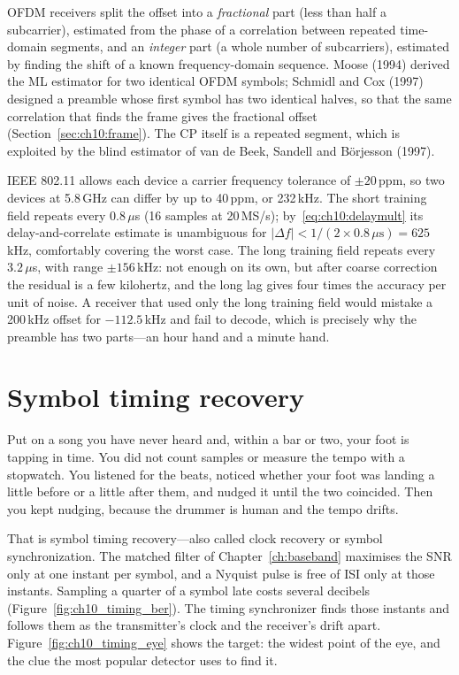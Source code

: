OFDM receivers split the offset into a \emph{fractional} part (less than half a subcarrier),
estimated from the phase of a correlation between repeated time-domain segments, and an
\emph{integer} part (a whole number of subcarriers), estimated by finding the shift of a known
frequency-domain sequence. Moose (1994) derived the ML estimator for two identical OFDM symbols;
Schmidl and Cox (1997) designed a preamble whose first symbol has two identical halves, so that the
same correlation that finds the frame gives the fractional offset (Section~\ref{sec:ch10:frame}). The
CP itself is a repeated segment, which is exploited by the blind estimator of van de Beek, Sandell
and B\"orjesson (1997).

\begin{worked}
IEEE 802.11 allows each device a carrier frequency tolerance of $\pm20$\,ppm, so two devices at
5.8\,GHz can differ by up to 40\,ppm, or 232\,kHz. The short training field repeats every
$0.8\,\mu$s (16 samples at 20\,MS/s); by~\eqref{eq:ch10:delaymult} its delay-and-correlate estimate is
unambiguous for $|\Delta f|<1/(2\times0.8\,\mu\text{s})=625$\,kHz, comfortably covering the worst case. The
long training field repeats every $3.2\,\mu$s, with range $\pm156$\,kHz: not enough on its own, but
after coarse correction the residual is a few kilohertz, and the long lag gives four times the
accuracy per unit of noise. A receiver that used only the long training field would mistake a
200\,kHz offset for $-112.5$\,kHz and fail to decode, which is precisely why the preamble has two
parts---an hour hand and a minute hand.
\end{worked}

\section{Symbol timing recovery}
\label{sec:ch10:timing}

Put on a song you have never heard and, within a bar or two, your foot is tapping in time. You
did not count samples or measure the tempo with a stopwatch. You listened for the beats, noticed
whether your foot was landing a little before or a little after them, and nudged it until the
two coincided. Then you kept nudging, because the drummer is human and the tempo drifts.

That is symbol timing recovery---also called clock recovery or symbol synchronization. The matched
filter of Chapter~\ref{ch:baseband} maximises the SNR only at one instant per symbol, and a Nyquist
pulse is free of ISI only at those instants. Sampling a quarter of a symbol late costs several
decibels (Figure~\ref{fig:ch10_timing_ber}). The timing synchronizer finds those instants and follows
them as the transmitter's clock and the receiver's drift apart. Figure~\ref{fig:ch10_timing_eye}
shows the target: the widest point of the eye, and the clue the most popular detector uses to find it.

